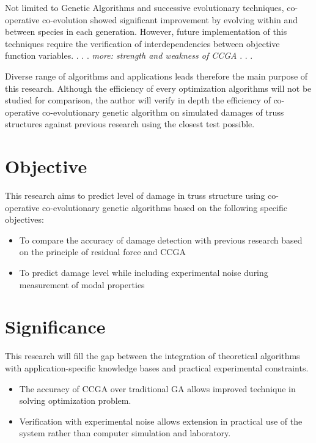 Not limited to Genetic Algorithms and successive evolutionary techniques, co-operative co-evolution \cite{potter1994} showed significant improvement by evolving within and between species in each generation. 
However, future implementation of this techniques require the verification of interdependencies between objective function variables. 
 . . . \emph{more: strength and weakness of CCGA} . . .

Diverse range of algorithms and applications leads therefore the main purpose of this research. Although the efficiency of every optimization algorithms will not be studied for comparison, the author will verify in depth the efficiency of co-operative co-evolutionary genetic algorithm on simulated damages of truss structures against previous research using the closest test possible.

\section{Objective}

This research aims to predict level of damage in truss structure using co-operative co-evolutionary genetic algorithms based on the following specific objectives:

\begin{itemize}[leftmargin=\dimexpr 14pt+0.63in]
\item To compare the accuracy of damage detection with previous research based on the principle of residual force and CCGA

\item To predict damage level while including experimental noise during measurement of modal properties
\end{itemize}


\section{Significance}

This research will fill the gap between the integration of theoretical algorithms with application-specific knowledge bases and practical experimental constraints.

\begin{itemize}[leftmargin=\dimexpr 14pt+0.63in]
\item The accuracy of CCGA over traditional GA allows improved technique in solving optimization problem.

\item Verification with experimental noise allows extension in practical use of the system rather than computer simulation and laboratory.
\end{itemize}

